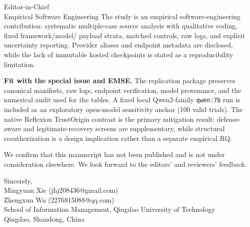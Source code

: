 \documentclass[9pt]{letter}
\begin{document}
\begin{letter}{Editor-in-Chief\\
Empirical Software Engineering}
The study is an empirical software-engineering contribution: systematic
multiple-case source analysis with qualitative coding, fixed framework/model/
payload strata, matched controls, raw logs, and explicit uncertainty reporting.
Provider aliases and endpoint metadata are disclosed, while the lack of
immutable hosted checkpoints is stated as a reproducibility limitation.

\textbf{Fit with the special issue and EMSE.}
The replication package preserves canonical manifests, raw logs, endpoint
verification, model provenance, and the numerical audit used for the tables.
A fixed local Qwen2-family \texttt{qwen:7b} run is included as an exploratory
open-model sensitivity anchor (100 valid trials). The native Reflexion
TrustOrigin contrast is the primary mitigation result; defense-aware and
legitimate-recovery screens are supplementary, while structural
reauthorization is a design implication rather than a separate empirical RQ.

We confirm that this manuscript has not been published and is not under
consideration elsewhere.  We look forward to the editors' and reviewers'
feedback.

\closing{Sincerely,\\[1em]
Mingyuan Xie (jhj208436@gmail.com)\\
Zhengxun Wu (2276815088@qq.com)\\
School of Information Management, Qingdao University of Technology\\
Qingdao, Shandong, China}

\end{letter}
\end{document}
